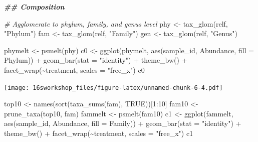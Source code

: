 \documentclass[
]{book}
\newenvironment{Shaded}{\begin{snugshade}}{\end{snugshade}}
\newcommand{\AttributeTok}[1]{\textcolor[rgb]{0.77,0.63,0.00}{#1}}
\newcommand{\CommentTok}[1]{\textcolor[rgb]{0.56,0.35,0.01}{\textit{#1}}}
\newcommand{\ConstantTok}[1]{\textcolor[rgb]{0.00,0.00,0.00}{#1}}
\newcommand{\DecValTok}[1]{\textcolor[rgb]{0.00,0.00,0.81}{#1}}
\newcommand{\DocumentationTok}[1]{\textcolor[rgb]{0.56,0.35,0.01}{\textbf{\textit{#1}}}}
\newcommand{\FunctionTok}[1]{\textcolor[rgb]{0.00,0.00,0.00}{#1}}
\newcommand{\NormalTok}[1]{#1}
\newcommand{\OtherTok}[1]{\textcolor[rgb]{0.56,0.35,0.01}{#1}}
\newcommand{\SpecialCharTok}[1]{\textcolor[rgb]{0.00,0.00,0.00}{#1}}
\newcommand{\StringTok}[1]{\textcolor[rgb]{0.31,0.60,0.02}{#1}}
\begin{document}
\begin{Shaded}
\begin{Highlighting}[]
\DocumentationTok{\#\# Composition}

\CommentTok{\# Agglomerate to phylum, family, and genus level}
\NormalTok{phy }\OtherTok{\textless{}{-}} \FunctionTok{tax\_glom}\NormalTok{(relf, }\StringTok{"Phylum"}\NormalTok{)}
\NormalTok{fam }\OtherTok{\textless{}{-}} \FunctionTok{tax\_glom}\NormalTok{(relf, }\StringTok{"Family"}\NormalTok{)}
\NormalTok{gen }\OtherTok{\textless{}{-}} \FunctionTok{tax\_glom}\NormalTok{(relf, }\StringTok{"Genus"}\NormalTok{)}

\NormalTok{phymelt }\OtherTok{\textless{}{-}} \FunctionTok{psmelt}\NormalTok{(phy)}
\NormalTok{c0 }\OtherTok{\textless{}{-}} \FunctionTok{ggplot}\NormalTok{(phymelt, }\FunctionTok{aes}\NormalTok{(sample\_id, Abundance, }\AttributeTok{fill =}\NormalTok{ Phylum)) }\SpecialCharTok{+}
  \FunctionTok{geom\_bar}\NormalTok{(}\AttributeTok{stat =} \StringTok{"identity"}\NormalTok{) }\SpecialCharTok{+}
  \FunctionTok{theme\_bw}\NormalTok{() }\SpecialCharTok{+}
  \FunctionTok{facet\_wrap}\NormalTok{(}\SpecialCharTok{\textasciitilde{}}\NormalTok{treatment, }\AttributeTok{scales =} \StringTok{"free\_x"}\NormalTok{)}
\NormalTok{c0}
\end{Highlighting}
\end{Shaded}

\texttt{[image: 16sworkshop\_files/figure-latex/unnamed-chunk-6-4.pdf]}

\begin{Shaded}
\begin{Highlighting}[]
\NormalTok{top10 }\OtherTok{\textless{}{-}} \FunctionTok{names}\NormalTok{(}\FunctionTok{sort}\NormalTok{(}\FunctionTok{taxa\_sums}\NormalTok{(fam), }\ConstantTok{TRUE}\NormalTok{))[}\DecValTok{1}\SpecialCharTok{:}\DecValTok{10}\NormalTok{]}
\NormalTok{fam10 }\OtherTok{\textless{}{-}} \FunctionTok{prune\_taxa}\NormalTok{(top10, fam)}
\NormalTok{fammelt }\OtherTok{\textless{}{-}} \FunctionTok{psmelt}\NormalTok{(fam10)}
\NormalTok{c1 }\OtherTok{\textless{}{-}} \FunctionTok{ggplot}\NormalTok{(fammelt, }\FunctionTok{aes}\NormalTok{(sample\_id, Abundance, }\AttributeTok{fill =}\NormalTok{ Family)) }\SpecialCharTok{+}
  \FunctionTok{geom\_bar}\NormalTok{(}\AttributeTok{stat =} \StringTok{"identity"}\NormalTok{) }\SpecialCharTok{+}
  \FunctionTok{theme\_bw}\NormalTok{() }\SpecialCharTok{+}
  \FunctionTok{facet\_wrap}\NormalTok{(}\SpecialCharTok{\textasciitilde{}}\NormalTok{treatment, }\AttributeTok{scales =} \StringTok{"free\_x"}\NormalTok{)}
\NormalTok{c1}
\end{Highlighting}
\end{Shaded}
\end{document}
